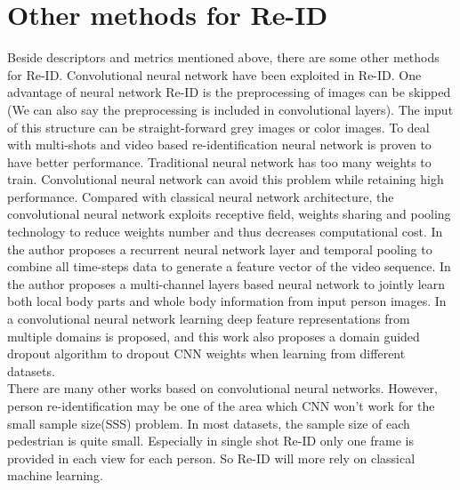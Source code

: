 \section{Other methods for Re-ID}
Beside descriptors and metrics mentioned above, there are some other methods for Re-ID. Convolutional neural network have been exploited in Re-ID. One advantage of neural network Re-ID is the preprocessing of images can be skipped (We can also say the preprocessing is included in convolutional layers). The input of this structure can be straight-forward grey images or color images. To deal with multi-shots and video based re-identification neural network is proven to have better performance. Traditional neural network has too many weights to train. Convolutional neural network can avoid this problem while retaining high performance. Compared with classical neural network architecture, the convolutional neural network exploits receptive field, weights sharing and pooling technology to reduce weights number and thus decreases computational cost. In \cite{RecurrentCNN} the author proposes a recurrent neural network layer and temporal pooling to combine all time-steps data to generate a feature vector of the video sequence. In \cite{MultiCNN} the author proposes a multi-channel layers based neural network to jointly learn both local body parts and whole body information from input person images.  In \cite{DeepfeatureCNN} a convolutional neural network learning deep feature representations from multiple domains is proposed, and this work also proposes a domain guided dropout algorithm to dropout CNN weights when learning from different datasets. \\
\indent There are many other works based on convolutional neural networks. However, person re-identification may be one of the area which CNN won't work for the small sample size(SSS) problem. In most datasets, the sample size of each pedestrian is quite small. Especially in single shot Re-ID only one frame is provided in each view for each person. So Re-ID will more rely on classical machine learning.

%


